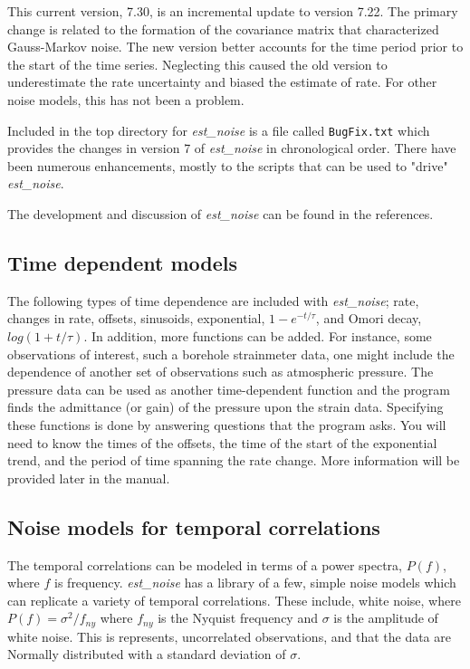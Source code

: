 \documentclass[12pt]{amsart}
\begin{document}
This current version, 7.30, is an incremental update to version 7.22.  The primary change is related to the formation of the
covariance matrix that characterized Gauss-Markov noise. The new version better accounts for the time period prior to the start
of the time series. Neglecting this caused the old version to underestimate the rate uncertainty and biased the estimate of rate.
For other noise models, this has not been a problem.

Included in the top directory for \textit{est\_noise} is a file called \texttt{BugFix.txt} which provides the changes in version 7 of  \textit{est\_noise} in
chronological order.  There have been numerous enhancements, mostly to the scripts that can be used to "drive" \textit{est\_noise}.

The development and discussion of \textit{est\_noise} can be found in the references. 

\subsection{Time dependent models}

The following types of time dependence are included with \textit{est\_noise};  rate, changes in rate, offsets, sinusoids,
exponential, $1-e^{-t/{\tau}}$, and Omori decay, $log(1 + t/{\tau})$. In addition, more functions can be added.  For instance,
some observations of interest, such a borehole strainmeter data, one might include the dependence of another set of observations such as atmospheric pressure. The pressure data can be used as another time-dependent function and the
program finds the admittance (or gain) of the pressure upon the strain data. Specifying these functions is done by answering
questions that the program asks. You will need to know the times of the offsets, the time of the start of the exponential trend,
and the period of time spanning the rate change.  More information will be provided later in the manual.

\subsection{Noise models for temporal correlations}

The temporal correlations can be modeled in terms of a power spectra, $P(f)$, where $f$ is frequency. \textit{est\_noise}
has a library of a few, simple noise models which can replicate a variety of temporal correlations. These include,
white noise, where $P(f)={\sigma^2}/f_{ny}$ where $f_{ny}$ is the Nyquist frequency and $\sigma$ is the amplitude
of white noise.  This is represents, uncorrelated observations, and that the data are Normally distributed with a standard
deviation of  $\sigma$.
\end{document}
